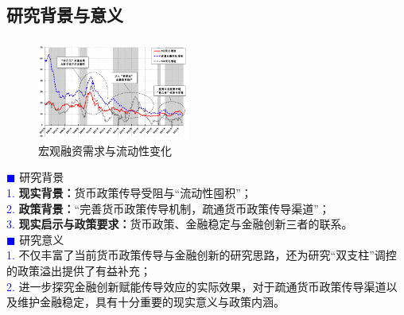 \documentclass[12pt,aspectratio=169]{ctexbeamer}
\begin{document}
			\subsection{研究背景与意义}		
			\begin{frame}[label=meaning]
				\frametitle{}
				\begin{figure}
					\includegraphics[width=5cm]{figures/fig.1-1}
					\caption{宏观融资需求与流动性变化}
					\label{流动性囤积}
				\end{figure}
				\vspace*{-3mm}
				\justifying
				\textcolor{blue}{$\blacksquare$} \large 研究背景\\
				\normalsize
				\hspace{2em}
				\textcolor{blue}{1.} \textbf{现实背景：}货币政策传导受阻与“流动性囤积”；\\
				\hspace{2em}
				\textcolor{blue}{2.} \textbf{政策背景：}“完善货币政策传导机制，疏通货币政策传导渠道”；\\
				\hspace{2em}
				\textcolor{blue}{3.} \textbf{现实启示与政策要求：}货币政策、金融稳定与金融创新三者的联系。\\
				\normalsize
				\textcolor{blue}{$\blacksquare$} \large 研究意义 \hyperlink{pr}{\beamergotobutton{}}\\
				\normalsize
				\hspace{2em}
				\textcolor{blue}{1.} 不仅丰富了当前货币政策传导与金融创新的研究思路，还为研究“双支柱”调控的政策溢出提供了有益补充；\\
				\hspace{2em}
				\textcolor{blue}{2.} 进一步探究金融创新赋能传导效应的实际效果，对于疏通货币政策传导渠道以及维护金融稳定，具有十分重要的现实意义与政策内涵。
			\end{frame}
\end{document}
